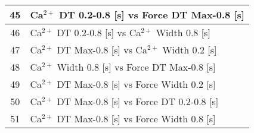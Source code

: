 \documentclass{article}
\begin{document}
\begin{longtable}{|c|l|}
\hline
45 & Ca$^{2+}$ DT 0.2-0.8 [s] vs Force DT Max-0.8 [s] \\
\hline
46 & Ca$^{2+}$ DT 0.2-0.8 [s] vs Ca$^{2+}$ Width 0.8 [s] \\
\hline
47 & Ca$^{2+}$ DT Max-0.8 [s] vs Ca$^{2+}$ Width 0.2 [s] \\
\hline
48 & Ca$^{2+}$ Width 0.8 [s] vs Force DT Max-0.8 [s] \\
\hline
49 & Ca$^{2+}$ DT Max-0.8 [s] vs Force Width 0.2 [s] \\
\hline
50 & Ca$^{2+}$ DT Max-0.8 [s] vs Force DT 0.2-0.8 [s] \\
\hline
51 & Ca$^{2+}$ DT Max-0.8 [s] vs Force Width 0.8 [s] \\
\hline

\end{longtable}
\end{document}
